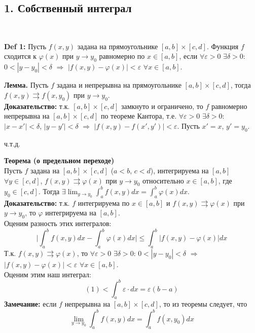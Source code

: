 \documentclass[book, 11pt]{report}
\begin{document}
\subsection*{1. Собственный интеграл}
\par{\ }
\par{\textbf{Def 1: }Пусть $f(x,y)$ задана на прямоугольнике $[a,b]\times[c,d]$. Функция $f$ сходится к $\varphi(x)$ при $y\to y_0$ равномерно по $x\in[a,b]$, если $\forall\varepsilon>0$ $\exists\delta>0$: $0<|y-y_0|<\delta$ $\Rightarrow$ $|f(x,y)-\varphi(x)|<\varepsilon$ $\forall x\in[a,b]$.}
\vspace{0.5cm}
\par{\textbf{Лемма. }Пусть $f$ задана и непрерывна на прямоугольнике $[a,b]\times[c,d]$, тогда $f(x,y)\rightrightarrows f(x,y_0)$ при $y\to y_0$.\\
\textbf{Доказательство: }т.к. $[a,b]\times[c,d]$ замкнуто и ограничено, то $f$ равномерно непрерывна на $[a,b]\times[c,d]$ по теореме Кантора, т.е. $\forall\varepsilon>0$ $\exists\delta>0$: $|x-x'|<\delta$, $|y-y'|<\delta$ $\Rightarrow$ $|f(x,y)-f(x',y')|<\varepsilon$. Пусть $x'=x$, $y'=y_0$.
}
\par{{\raggedleft ч.т.д.\par}}
    \vspace{0.5cm}
\par{
\textbf{Теорема (о предельном переходе)}\\
Пусть $f$ задана на $[a,b]\times[c,d]$ ($a<b$, $c<d$), интегрируема на $[a,b]$ $\forall y\in[c,d]$, $f(x,y)\rightrightarrows\varphi(x)$ при $y\to y_0$ относительно $x\in[a,b]$, где $y_0\in[c,d]$. Тогда $\displaystyle\exists\lim_{y\to y_0}\int_a^bf(x,y)dx=\int_a^b\varphi(x)dx$.\\
\textbf{Доказательство: }т.к. $f$ интегрируема по $x\in[a,b]$ и $f(x,y)\rightrightarrows\varphi(x)$ при $y\to y_0$, то $\varphi$ интегрируема на $[a,b]$.\\
Оценим разность этих интегралов:
\begin{equation}
    \bigg|\int_a^bf(x,y)dx-\int_a^b\varphi(x)dx\bigg|\leq\int_a^b|f(x,y)-\varphi(x)|dx
\end{equation}
Т.к. $f(x,y)\rightrightarrows\varphi(x)$, то $\forall\varepsilon>0$ $\exists\delta>0$: $0<|y-y_0|<\delta$ $\Rightarrow$ $|f(x,y)-\varphi(x)|<\varepsilon$ $\forall x\in[a,b]$. \\Оценим этим наш интеграл:
\begin{equation}
    (1)<\int_a^b\varepsilon\cdot dx=\varepsilon(b-a)
\end{equation}
\textbf{Замечание: }если $f$ непрерывна на $[a,b]\times[c,d]$, то из теоремы следует, что
\begin{equation}
    \lim_{y\to y_0}\int_a^bf(x,y)dx=\int_a^bf(x,y_0)dx
\end{equation}
}
\end{document}
